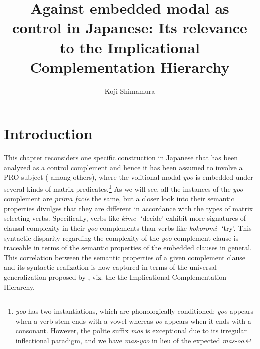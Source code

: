 \documentclass[output=paper]{langsci/langscibook}
\author{Koji Shimamura\affiliation{Kobe City University of Foreign Studies}}
\title[Against embedded modal as control in Japanese]
      {Against embedded modal as control in Japanese: Its relevance to the Implicational Complementation Hierarchy}
\begin{document}
\maketitle

\section{Introduction}
This chapter reconsiders one specific construction in Japanese that has been analyzed as a control complement and hence it has been assumed to involve a PRO subject (\citealt{fujii2006,fujii2010,takano2010,uchibori2000} among others), where the volitional modal \textit{yoo} is embedded under several kinds of matrix predicates.\footnote{\textit{yoo} has two instantiations, which are phonologically conditioned: \textit{yoo} appears when a verb stem ends with a vowel whereas \textit{oo} appears when it ends with a consonant. However, the polite suffix \textit{mas} is exceptional due to its irregular inflectional paradigm, and we have \textit{mas-yoo} in lieu of the expected \textit{mas-oo}.} As we will see, all the instances of the \textit{yoo} complement are \textit{prima facie} the same, but a closer look into their semantic properties divulges that they are different in accordance with the types of matrix selecting verbs. Specifically, verbs like \textit{kime-} `decide' exhibit more signatures of clausal complexity in their \textit{yoo} complements than verbs like \textit{kokoromi-} `try'. This syntactic disparity regarding the complexity of the \textit{yoo} complement clause is traceable in terms of the semantic properties of the embedded clauses in general. This correlation between the semantic properties of a given complement clause and its syntactic realization is now captured in terms of the universal generalization proposed by \citet{wurmbrandlohninger2020}, viz. the the Implicational Complementation Hierarchy.
\end{document}
